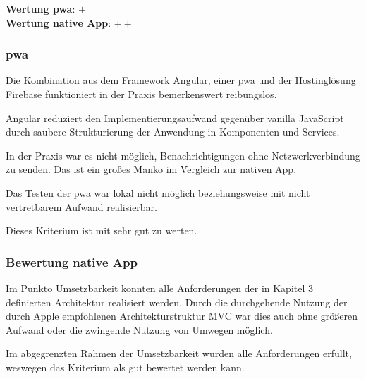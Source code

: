 \textbf{Wertung \ac{pwa}}: $+$\\
\textbf{Wertung native App}: $++$ \\

\subsubsection{\ac{pwa}}
Die Kombination aus dem Framework Angular, einer \ac{pwa} und der Hostinglösung Firebase funktioniert in der Praxis bemerkenswert reibungslos.

Angular reduziert den Implementierungsaufwand gegenüber vanilla JavaScript durch saubere Strukturierung der Anwendung in Komponenten und Services.

In der Praxis war es nicht möglich, Benachrichtigungen ohne Netzwerkverbindung zu senden. Das ist ein großes Manko im Vergleich zur nativen App.

Das Testen der \ac{pwa} war lokal nicht möglich beziehungsweise mit nicht vertretbarem Aufwand realisierbar.

Dieses Kriterium ist mit sehr gut zu werten.

\subsubsection{Bewertung native App}
Im Punkto Umsetzbarkeit konnten alle Anforderungen der in Kapitel 3 definierten Architektur realisiert werden. Durch die durchgehende Nutzung der durch Apple empfohlenen Architekturstruktur MVC war dies auch ohne größeren Aufwand oder die zwingende Nutzung von Umwegen möglich.

Im abgegrenzten Rahmen der Umsetzbarkeit wurden alle Anforderungen erfüllt, weswegen das Kriterium als gut bewertet werden kann.